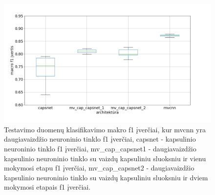 \begin{figure}[H]
	\centering
	\includegraphics[scale=0.4]{img/boxplot_f1_macro.png}
	\caption{
		Testavimo duomenų klasifikavimo makro f1 įverčiai, kur mvcnn yra daugiavaizdžio neuroninio tinklo f1 įverčiai, capsnet - kapsulinio neuroninio tinklo f1 įverčiai, mv\_cap\_capsnet1 - daugiavaizdžio kapsulinio neuroninio tinklo su vaizdų kapsuliniu sluoksniu ir vienu mokymosi etapu f1 įverčiai, mv\_cap\_capsnet2 - daugiavaizdžio kapsulinio neuroninio tinklo su vaizdų kapsuliniu sluoksniu ir dviem mokymosi etapais f1 įverčiai.
	}
	\label{img:box_macro_f1}
\end{figure}
